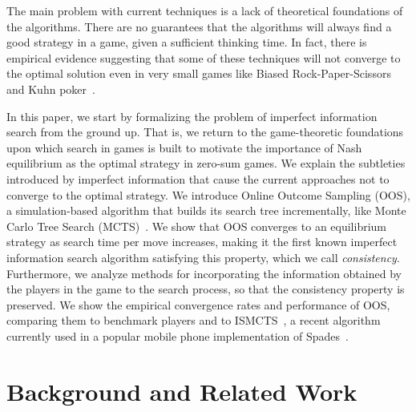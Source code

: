 \documentclass[letterpaper]{article}
\newcounter{vlNoteCounter}
\newcommand{\vlnote}[1]{{\scriptsize \color{blue} $\blacksquare$ \refstepcounter{vlNoteCounter}\textsf{[VL]$_{\arabic{vlNoteCounter}}$:{#1}}}}
\begin{document}

The main problem with current techniques is a lack of theoretical foundations of the algorithms. There are no guarantees that the algorithms will always find a good strategy in a game, given a sufficient thinking time. In fact, there is empirical evidence suggesting that some of these techniques will not converge to the optimal solution even in very small games like Biased Rock-Paper-Scissors and Kuhn poker~\cite{Shafiei09,Ponsen11Computing}.

In this paper, we start by formalizing the problem of imperfect information search from the ground up. That is, we return to the game-theoretic 
foundations upon which search in games is built to motivate the importance of Nash equilibrium as the optimal strategy in zero-sum games. We explain the subtleties introduced by imperfect information that cause the current approaches not to converge to the optimal strategy. We introduce Online Outcome Sampling (OOS), a simulation-based algorithm that builds its search tree incrementally, like Monte Carlo Tree Search (MCTS)~\cite{mctssurvey}.  
We show that OOS converges to an equilibrium strategy as search time per move increases, making it the first 
known imperfect information search algorithm satisfying this property, which we call {\it consistency}. Furthermore, we analyze methods for incorporating the information obtained by the players in the game to the search process, so that the consistency property is preserved. We show the empirical convergence rates and performance of OOS, comparing them to benchmark players and to ISMCTS~\cite{Cowling12ISMCTS}, a 
recent algorithm currently used in a popular mobile phone implementation of Spades~\cite{Whitehouse13Integrating}. 




\section{Background and Related Work}
\end{document}
